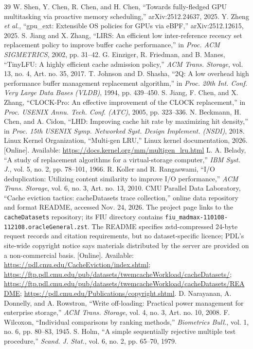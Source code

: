 \documentclass[10pt,twocolumn]{article}
\begin{document}
\begin{thebibliography}{39}
 W. Shen, Y. Chen, R. Chen, and H. Chen, ``Towards fully-fledged GPU multitasking via proactive memory scheduling,'' arXiv:2512.24637, 2025.
 Y. Zheng \emph{et al.}, ``gpu\_ext: Extensible OS policies for GPUs via eBPF,'' arXiv:2512.12615, 2025.
 S. Jiang and X. Zhang, ``LIRS: An efficient low inter-reference recency set replacement policy to improve buffer cache performance,'' in \emph{Proc. ACM SIGMETRICS}, 2002, pp. 31--42.
 G. Einziger, R. Friedman, and B. Manes, ``TinyLFU: A highly efficient cache admission policy,'' \emph{ACM Trans. Storage}, vol. 13, no. 4, Art. no. 35, 2017.
 T. Johnson and D. Shasha, ``2Q: A low overhead high performance buffer management replacement algorithm,'' in \emph{Proc. 20th Int. Conf. Very Large Data Bases (VLDB)}, 1994, pp. 439--450.
 S. Jiang, F. Chen, and X. Zhang, ``CLOCK-Pro: An effective improvement of the CLOCK replacement,'' in \emph{Proc. USENIX Annu. Tech. Conf. (ATC)}, 2005, pp. 323--336.
 N. Beckmann, H. Chen, and A. Cidon, ``LHD: Improving cache hit rate by maximizing hit density,'' in \emph{Proc. 15th USENIX Symp. Networked Syst. Design Implement. (NSDI)}, 2018.
 Linux Kernel Organization, ``Multi-gen LRU,'' Linux kernel documentation, 2026. [Online]. Available: \url{https://docs.kernel.org/mm/multigen_lru.html}
 L. A. Belady, ``A study of replacement algorithms for a virtual-storage computer,'' \emph{IBM Syst. J.}, vol. 5, no. 2, pp. 78--101, 1966.
 R. Koller and R. Rangaswami, ``I/O deduplication: Utilizing content similarity to improve I/O performance,'' \emph{ACM Trans. Storage}, vol. 6, no. 3, Art. no. 13, 2010.
 CMU Parallel Data Laboratory, ``Cache eviction tactics: cacheDatasets trace collection,'' online data repository and format README, accessed Nov. 24, 2026. The project page links to the \texttt{cacheDatasets} repository; its FIU directory contains \texttt{fiu\_madmax-110108-112108.oracleGeneral.zst}. The README specifies zstd-compressed 24-byte request records and citation requirements, but no dataset-specific licence; PDL's site-wide copyright notice says materials distributed by the server are provided on a non-commercial basis. [Online]. Available: \url{https://pdl.cmu.edu/CacheEviction/index.shtml}; \url{https://ftp.pdl.cmu.edu/pub/datasets/twemcacheWorkload/cacheDatasets/}; \url{https://ftp.pdl.cmu.edu/pub/datasets/twemcacheWorkload/cacheDatasets/README}; \url{https://pdl.cmu.edu/Publications/copyright.shtml}.
 D. Narayanan, A. Donnelly, and A. Rowstron, ``Write off-loading: Practical power management for enterprise storage,'' \emph{ACM Trans. Storage}, vol. 4, no. 3, Art. no. 10, 2008.
 F. Wilcoxon, ``Individual comparisons by ranking methods,'' \emph{Biometrics Bull.}, vol. 1, no. 6, pp. 80--83, 1945.
 S. Holm, ``A simple sequentially rejective multiple test procedure,'' \emph{Scand. J. Stat.}, vol. 6, no. 2, pp. 65--70, 1979.
\end{thebibliography}
\end{document}
